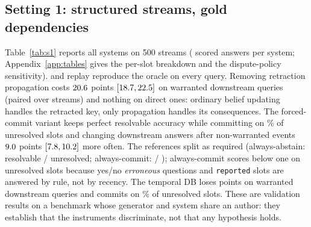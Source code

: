 \subsection{Setting 1: structured streams, gold dependencies}\label{sec:res-s1}

Table~\ref{tab:s1} reports all systems on 500 streams (\sOneAnswers{} scored answers per system; Appendix~\ref{app:tables} gives the per-slot breakdown and the dispute-policy sensitivity). \pal{} and replay reproduce the oracle on every query. Removing retraction propagation costs $20.6$ points $[18.7, 22.5]$ on warranted downstream queries (paired over \sOnePropN{} streams) and nothing on direct ones: ordinary belief updating handles the retracted key, only propagation handles its consequences. The forced-commit variant keeps perfect resolvable accuracy while committing on \sOneCommitRate\% of unresolved slots and changing downstream answers after non-warranted events $9.0$ points $[7.8, 10.2]$ more often. The references split as required (always-abstain: \sOneAbstainRes{} resolvable / \sOneAbstainUnres{} unresolved; always-commit: \sOneCommitRes{} / \sOneCommitUnres{}); always-commit scores below one on unresolved slots because yes/no \emph{erroneous} questions and \texttt{reported} slots are answered by rule, not by recency. The temporal DB loses \sOneTdbWarr{} points on warranted downstream queries and commits on \sOneTdbCommit\% of unresolved slots. These are validation results on a benchmark whose generator and system share an author: they establish that the instruments discriminate, not that any hypothesis holds.

